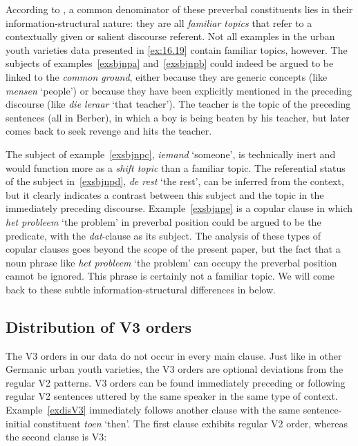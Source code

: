 \documentclass[output=paper]{langsci/langscibook}
\begin{document}
\noindent According to \textcite{Freywaldetal:2015}, a common denominator of
these preverbal constituents lies in their information-structural nature: they
are all \emph{familiar topics} that refer to a contextually given or salient discourse
referent. Not all examples in the  urban youth varieties data presented in
\eqref{ex:16.19} contain familiar topics, however. The subjects of
examples~\eqref{exsbjnpa} and~\eqref{exsbjnpb} could indeed be argued to be linked
to the \emph{common ground}, either because they are generic concepts (like
\emph{mensen} `people') or because they have been explicitly mentioned in the
preceding discourse (like \emph{die leraar} `that teacher'). The teacher is the
topic of the preceding sentences (all in Berber), in which a boy is being
beaten by his teacher, but later comes back to seek revenge and hits the
teacher.

The subject of example~\eqref{exsbjnpc}, \emph{iemand} `someone', is technically
inert and would function more as a \emph{shift topic} than a familiar topic. The
referential status of the subject in~\eqref{exsbjnpd}, \emph{de rest} `the rest',
can be inferred from the context, but it clearly indicates a contrast between
this subject and the topic in the immediately preceding discourse.
Example~\eqref{exsbjnpe} is a copular clause in which \emph{het
probleem} `the problem' in preverbal position could be argued to be the
predicate, with the \emph{dat}-clause as its subject. The analysis of these
types of copular clauses goes beyond the scope of the present
paper, but the fact that a noun phrase like \emph{het probleem} `the problem'
can occupy the preverbal position cannot be ignored. This phrase is certainly
not a familiar topic. We will come back to these subtle information-structural
differences in  below.

\subsection{Distribution of V3 orders}
\label{sec:datadis}

The V3 orders in our data do not occur in every main clause. Just like in other
Germanic urban youth varieties, the V3 orders are optional deviations from the
regular V2 patterns. V3 orders can be found immediately preceding or following
regular V2 sentences uttered by the same speaker in the same type of context.
Example~\eqref{exdisV3} immediately follows another clause with the same
sentence-initial constituent \emph{toen} `then'. The first clause exhibits
regular V2 order, whereas the second clause is V3:
\end{document}
